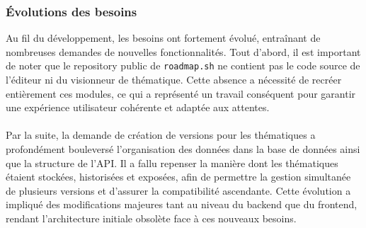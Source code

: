 \documentclass[12pt]{article}
\begin{document}
\subsubsection{Évolutions des besoins}
Au fil du développement, les besoins ont fortement évolué, entraînant de nombreuses demandes de nouvelles fonctionnalités. Tout d'abord, il est important de noter que le repository public de \texttt{roadmap.sh} ne contient pas le code source de l'éditeur ni du visionneur de thématique. Cette absence a nécessité de recréer entièrement ces modules, ce qui a représenté un travail conséquent pour garantir une expérience utilisateur cohérente et adaptée aux attentes.
\\\\
Par la suite, la demande de création de versions pour les thématiques a profondément bouleversé l'organisation des données dans la base de données ainsi que la structure de l'API. Il a fallu repenser la manière dont les thématiques étaient stockées, historisées et exposées, afin de permettre la gestion simultanée de plusieurs versions et d'assurer la compatibilité ascendante. Cette évolution a impliqué des modifications majeures tant au niveau du backend que du frontend, rendant l'architecture initiale obsolète face à ces nouveaux besoins.
\end{document}
